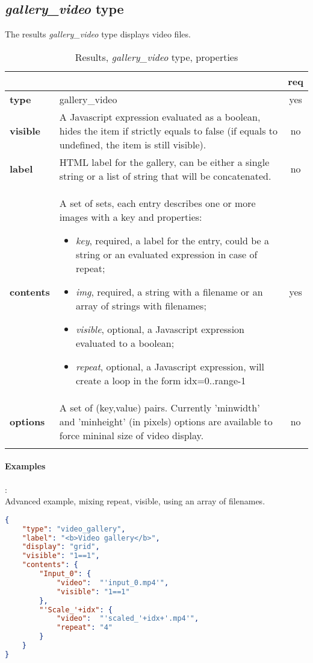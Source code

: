 \subsection{ \emph{gallery\_video} type}

The results \emph{gallery\_video} type displays video files.

\begin{longtable}{|>{\bf}L{\linewidth}|L{\linewidth}|c|}
\hline
      &  & {\bf req} 
\tabularnewline \hline \hline
 type       & gallery\_video  & yes \\ \hline
 visible    & A Javascript expression evaluated as a boolean, hides the item if
              strictly equals to false (if equals to undefined, the item is still visible).& no \\ \hline
 label      & HTML label for the gallery, can be either a single string or 
             a list of string that will be concatenated. & no \\ \hline
 contents   & A set of sets, each entry describes one or more images with a key and properties:
\vspace{-1em}
\begin{itemize}
    \setlength\itemsep{-0.5em}
    \item \textit{key}, required, a label for the entry, could be a string or an evaluated expression in case of repeat;
    \item \textit{img}, required, a string with a filename or an array of strings with filenames;
    \item \textit{visible}, optional, a Javascript expression evaluated to a boolean;
    \item \textit{repeat}, optional, a Javascript expression, will create a loop in the form idx=0..range-1
\end{itemize} 
\vspace{-1em} & yes \\ \hline
 options    & A set of (key,value) pairs. Currently
              'minwidth' and 'minheight' (in pixels) options are available to force
              mininal size of video display. & no \\ \hline
\caption{Results, \emph{gallery\_video} type, properties}
\end{longtable}

\paragraph{Examples}:\\
Advanced example, mixing repeat, visible, using an array of filenames.
\begin{lstlisting}[language=json,firstnumber=1]
{
    "type": "video_gallery",
    "label": "<b>Video gallery</b>",
    "display": "grid",
    "visible": "1==1",
    "contents": {
        "Input_0": {
            "video":  "'input_0.mp4'",
            "visible": "1==1"
        },
        "'Scale_'+idx": {
            "video":  "'scaled_'+idx+'.mp4'",
            "repeat": "4"
        }
    }
}
\end{lstlisting}




